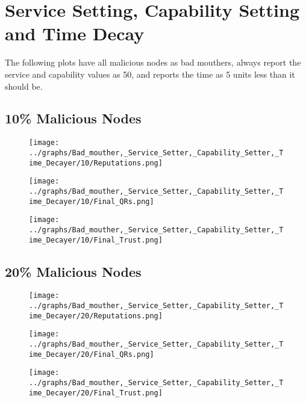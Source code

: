 \documentclass{article}
\begin{document}
    \section*{Service Setting, Capability Setting and Time Decay}
    The following plots have all malicious nodes as bad mouthers, always
    report the service and capability values as 50, and reports the time as
    5 units less than it should be.
    \\
  \begin{minipage}[t]{0.49\columnwidth}
    \subsection*{10\% Malicious Nodes}
        \begin{figure}[H]
            \centering
            \texttt{[image: ../graphs/Bad\_mouther,\_Service\_Setter,\_Capability\_Setter,\_Time\_Decayer/10/Reputations.png]}
        \end{figure}
        \begin{figure}[H]
            \centering
            \texttt{[image: ../graphs/Bad\_mouther,\_Service\_Setter,\_Capability\_Setter,\_Time\_Decayer/10/Final\_QRs.png]}
        \end{figure}
    \end{minipage}
    \begin{minipage}[t]{0.49\columnwidth}
        \begin{figure}[H]
            \centering
            \texttt{[image: ../graphs/Bad\_mouther,\_Service\_Setter,\_Capability\_Setter,\_Time\_Decayer/10/Final\_Trust.png]}
        \end{figure}
    \end{minipage}

  \begin{minipage}[t]{0.49\columnwidth}
    \subsection*{20\% Malicious Nodes}
        \begin{figure}[H]
            \centering
            \texttt{[image: ../graphs/Bad\_mouther,\_Service\_Setter,\_Capability\_Setter,\_Time\_Decayer/20/Reputations.png]}
        \end{figure}
        \begin{figure}[H]
            \centering
            \texttt{[image: ../graphs/Bad\_mouther,\_Service\_Setter,\_Capability\_Setter,\_Time\_Decayer/20/Final\_QRs.png]}
        \end{figure}
    \end{minipage}
    \begin{minipage}[t]{0.49\columnwidth}
        \begin{figure}[H]
            \centering
            \texttt{[image: ../graphs/Bad\_mouther,\_Service\_Setter,\_Capability\_Setter,\_Time\_Decayer/20/Final\_Trust.png]}
        \end{figure}
    \end{minipage}
\end{document}
